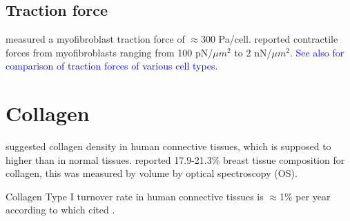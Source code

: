 \documentclass{article}
\newcommand{\LEK}[1]{\textcolor{blue}{#1}}
\begin{document}
    \subsection{Traction force}
        \cite{chen2007alpha} measured a myofibroblast traction force of $\approx 300$ Pa/cell. \cite{yang2021quantitative} reported contractile forces from myofibroblasts ranging from 100 pN/$\mu m^2$ to 2 nN/$\mu m^2$. \LEK{See also \cite{zollinger2018dependence} for comparison of traction forces of various cell types.}

\section*{Collagen}

\cite{rutenberg2016uniform} suggested collagen density in human connective tissues, which is supposed to higher than in normal tissues. \cite{kehm2022comparison} reported 17.9-21.3\% breast tissue composition for collagen, this was measured by volume by optical spectroscopy (OS).

Collagen Type I turnover rate in human connective tissues is $\approx$1\% per year according to \cite{hackenberg2020collagen} which cited \cite{verzijl2000effect}. 

\newpage
  
\end{document}
